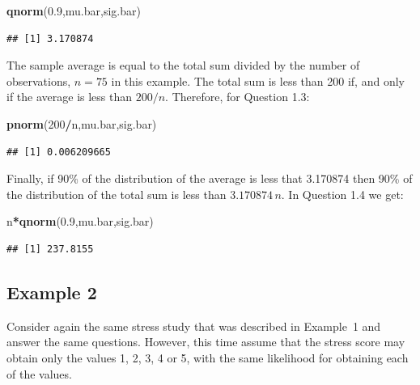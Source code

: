 \documentclass[
]{krantz}
\makeatletter
\newenvironment{Shaded}{\begin{snugshade}}{\end{snugshade}}
\newcommand{\DecValTok}[1]{\textcolor[rgb]{0.00,0.00,0.81}{#1}}
\newcommand{\FloatTok}[1]{\textcolor[rgb]{0.00,0.00,0.81}{#1}}
\newcommand{\KeywordTok}[1]{\textcolor[rgb]{0.13,0.29,0.53}{\textbf{#1}}}
\newcommand{\NormalTok}[1]{#1}
\newcommand{\OperatorTok}[1]{\textcolor[rgb]{0.81,0.36,0.00}{\textbf{#1}}}
\newenvironment{kframe}{%
\medskip{}
\setlength{\fboxsep}{.8em}
 \def\at@end@of@kframe{}%
 \ifinner\ifhmode%
  \def\at@end@of@kframe{\end{minipage}}%
  \begin{minipage}{\columnwidth}%
 \fi\fi%
 \def\FrameCommand##1{\hskip\@totalleftmargin \hskip-\fboxsep
 \colorbox{shadecolor}{##1}\hskip-\fboxsep
     \hskip-\linewidth \hskip-\@totalleftmargin \hskip\columnwidth}%
 \MakeFramed {\advance\hsize-\width
   \@totalleftmargin\z@ \linewidth\hsize
   \@setminipage}}%
 {\par\unskip\endMakeFramed%
 \at@end@of@kframe}
\renewenvironment{Shaded}{\begin{kframe}}{\end{kframe}}
\theoremstyle{definition}
\theoremstyle{definition}
\theoremstyle{definition}
\theoremstyle{remark}
\makeatother
\begin{document}
\begin{Shaded}
\begin{Highlighting}[]
\KeywordTok{qnorm}\NormalTok{(}\FloatTok{0.9}\NormalTok{,mu.bar,sig.bar)}
\end{Highlighting}
\end{Shaded}

\begin{verbatim}
## [1] 3.170874
\end{verbatim}

The sample average is equal to the total sum divided by the number of
observations, \(n=75\) in this example. The total sum is less than 200 if,
and only if the average is less than \(200/n\). Therefore, for Question
1.3:

\begin{Shaded}
\begin{Highlighting}[]
\KeywordTok{pnorm}\NormalTok{(}\DecValTok{200}\OperatorTok{/}\NormalTok{n,mu.bar,sig.bar)}
\end{Highlighting}
\end{Shaded}

\begin{verbatim}
## [1] 0.006209665
\end{verbatim}

Finally, if 90\% of the distribution of the average is less that 3.170874
then 90\% of the distribution of the total sum is less than
\(3.170874\, n\). In Question 1.4 we get:

\begin{Shaded}
\begin{Highlighting}[]
\NormalTok{n}\OperatorTok{*}\KeywordTok{qnorm}\NormalTok{(}\FloatTok{0.9}\NormalTok{,mu.bar,sig.bar)}
\end{Highlighting}
\end{Shaded}

\begin{verbatim}
## [1] 237.8155
\end{verbatim}

\hypertarget{example-2}{%
\subsection{Example 2}\label{example-2}}

Consider again the same stress study that was described in Example~1 and
answer the same questions. However, this time assume that the stress
score may obtain only the values 1, 2, 3, 4 or 5, with the same
likelihood for obtaining each of the values.
\end{document}
